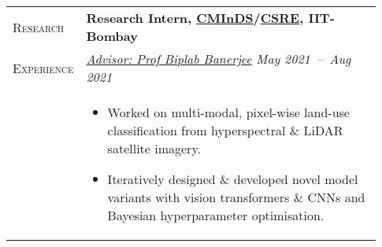 \documentclass[letterpaper, 10pt, oneside]{article}
\newcommand{\stitle}[1]{\normalsize{\textsc{#1}}}
\newcommand{\bdit}[1]{{\textbf{#1}}}
\begin{document}
\begin{longtable}{@{} p{0.13\linewidth} p{0.8\linewidth}}


    \stitle{Research}    & \bdit{Research Intern, \href{http://www.minds.iitb.ac.in/}{CMInDS}/\href{https://www.csre.iitb.ac.in/}{CSRE}, IIT-Bombay}                                                                                                     \\
    \stitle{Experience}  & \textsl{\href{https://biplab-banerjee.github.io/}{Advisor: Prof Biplab Banerjee}} \hfill \textsl{May 2021\ --\ Aug 2021}                                                                                                      \\
                         & \parbox{0.8\textwidth}{                                                                                                                                                                                                       %
        \begin{itemize}[leftmargin=*, itemsep=-0.88ex, topsep=-0.88ex]
            \item Worked on multi-modal, pixel-wise land-use classification from hyperspectral \& LiDAR satellite imagery.
            \item Iteratively designed \& developed novel model variants with vision transformers \& CNNs and Bayesian hyperparameter optimisation.
        \end{itemize}
    }
    \\
    \\


\end{longtable}
\end{document}
